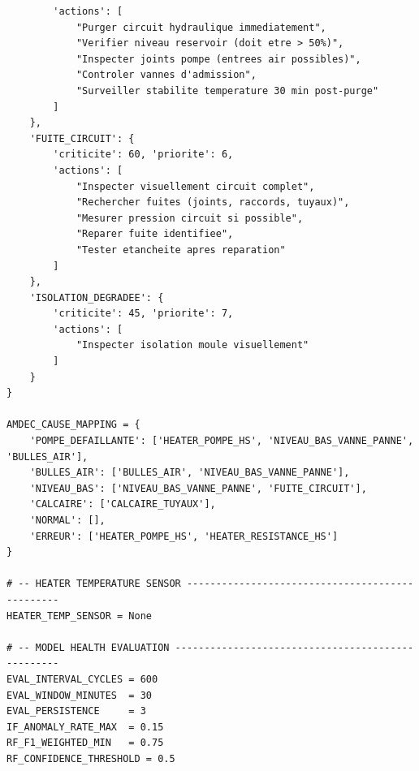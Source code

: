 \begin{lstlisting}
        'actions': [
            "Purger circuit hydraulique immediatement",
            "Verifier niveau reservoir (doit etre > 50%)",
            "Inspecter joints pompe (entrees air possibles)",
            "Controler vannes d'admission",
            "Surveiller stabilite temperature 30 min post-purge"
        ]
    },
    'FUITE_CIRCUIT': {
        'criticite': 60, 'priorite': 6,
        'actions': [
            "Inspecter visuellement circuit complet",
            "Rechercher fuites (joints, raccords, tuyaux)",
            "Mesurer pression circuit si possible",
            "Reparer fuite identifiee",
            "Tester etancheite apres reparation"
        ]
    },
    'ISOLATION_DEGRADEE': {
        'criticite': 45, 'priorite': 7,
        'actions': [
            "Inspecter isolation moule visuellement"
        ]
    }
}

AMDEC_CAUSE_MAPPING = {
    'POMPE_DEFAILLANTE': ['HEATER_POMPE_HS', 'NIVEAU_BAS_VANNE_PANNE', 'BULLES_AIR'],
    'BULLES_AIR': ['BULLES_AIR', 'NIVEAU_BAS_VANNE_PANNE'],
    'NIVEAU_BAS': ['NIVEAU_BAS_VANNE_PANNE', 'FUITE_CIRCUIT'],
    'CALCAIRE': ['CALCAIRE_TUYAUX'],
    'NORMAL': [],
    'ERREUR': ['HEATER_POMPE_HS', 'HEATER_RESISTANCE_HS']
}

# -- HEATER TEMPERATURE SENSOR ------------------------------------------------
HEATER_TEMP_SENSOR = None

# -- MODEL HEALTH EVALUATION --------------------------------------------------
EVAL_INTERVAL_CYCLES = 600
EVAL_WINDOW_MINUTES  = 30
EVAL_PERSISTENCE     = 3
IF_ANOMALY_RATE_MAX  = 0.15
RF_F1_WEIGHTED_MIN   = 0.75
RF_CONFIDENCE_THRESHOLD = 0.5
\end{lstlisting}

\endinput
